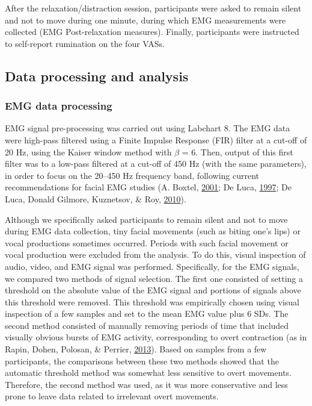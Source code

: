 \documentclass[a4paper,12pt,twoside,openright,oldfontcommands]{memoir}
\begin{document}
After the relaxation/distraction session, participants were asked to
remain silent and not to move during one minute, during which EMG
measurements were collected (EMG Post-relaxation measures). Finally,
participants were instructed to self-report rumination on the four VASs.

\subsection{Data processing and
analysis}\label{data-processing-and-analysis}

\subsubsection{EMG data processing}\label{emg-data-processing}

EMG signal pre-processing was carried out using Labchart 8. The EMG data
were high-pass filtered using a Finite Impulse Response (FIR) filter at
a cut-off of 20 Hz, using the Kaiser window method with \(\beta\) = 6.
Then, output of this first filter was to a low-pass filtered at a
cut-off of 450 Hz (with the same parameters), in order to focus on the
20--450 Hz frequency band, following current recommendations for facial
EMG studies (A. Boxtel,
\protect\hyperlink{ref-boxtel_optimal_2001}{2001}; De Luca,
\protect\hyperlink{ref-de_luca_use_1997}{1997}; De Luca, Donald Gilmore,
Kuznetsov, \& Roy,
\protect\hyperlink{ref-de_luca_filtering_2010}{2010}).

Although we specifically asked participants to remain silent and not to
move during EMG data collection, tiny facial movements (such as biting
one's lips) or vocal productions sometimes occurred. Periods with such
facial movement or vocal production were excluded from the analysis. To
do this, visual inspection of audio, video, and EMG signal was
performed. Specifically, for the EMG signals, we compared two methods of
signal selection. The first one consisted of setting a threshold on the
absolute value of the EMG signal and portions of signals above this
threshold were removed. This threshold was empirically chosen using
visual inspection of a few samples and set to the mean EMG value plus 6
SDs. The second method consisted of manually removing periods of time
that included visually obvious bursts of EMG activity, corresponding to
overt contraction (as in Rapin, Dohen, Polosan, \& Perrier,
\protect\hyperlink{ref-rapin_emg_2013}{2013}). Based on samples from a
few participants, the comparisons between these two methods showed that
the automatic threshold method was somewhat less sensitive to overt
movements. Therefore, the second method was used, as it was more
conservative and less prone to leave data related to irrelevant overt
movements.
\end{document}
